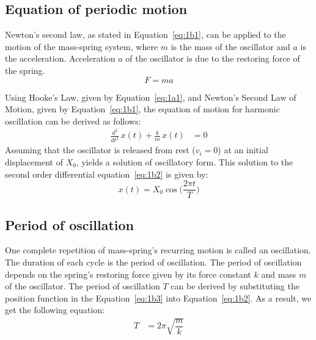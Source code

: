 \subsection{Equation of periodic motion}
Newton's second law, as stated in Equation~\eqref{eq:1b1}, can be applied to the motion of the mass-spring system, where $m$ is the mass of the oscillator and $a$ is the acceleration. Acceleration $a$ of the oscillator is due to the restoring force of the spring.
\begin{equation}
    F = ma \label{eq:1b1}
\end{equation}

Using Hooke's Law, given by Equation~\eqref{eq:1a1}, and Newton's Second Law of Motion, given by Equation~\eqref{eq:1b1}, the equation of motion for harmonic oscillation can be derived as follows:
\begin{align}
    \frac{d^2}{dt^2}\,x(t) + \frac{k}{m}\,x(t) &= 0 \label{eq:1b2}
\end{align}
Assuming that the oscillator is released from rest ($v_{i}=0$) at an initial displacement of $X_{0}$, yields a solution of oscillatory form. This solution to the second order differential equation~\eqref{eq:1b2} is given by:
\begin{equation}
    x(t) = X_{0}\cos{\Bigg(\frac{2\pi t}{T}\Bigg)} \label{eq:1b3}
\end{equation}

\subsection{Period of oscillation}
One complete repetition of mass-spring's recurring motion is called an oscillation. The duration of each cycle is the period of oscillation. The period of oscillation depends on the spring's restoring force given by its force constant $k$ and mass $m$ of the oscillator. The period of oscillation $T$ can be derived by substituting the position function in the Equation~\eqref{eq:1b3} into Equation~\eqref{eq:1b2}. As a result, we get the following equation:
\begin{align}
T &= 2\pi\sqrt{\dfrac{m}{k}} \label{eq:1b4}
\end{align}

